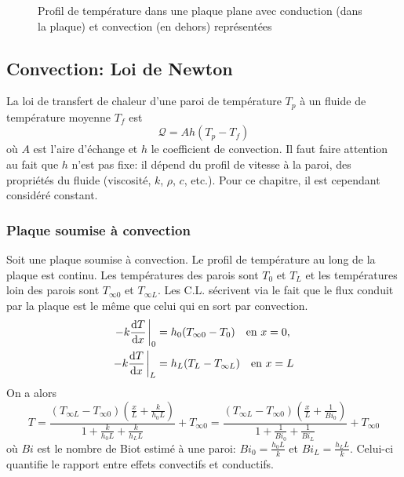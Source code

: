 \documentclass[a4paper,11pt]{report}
\newcommand{\recip}[1]{\frac{1}{#1}}
\begin{document}
        \begin{figure}[!h]
          \centering
          
          \caption{Profil de température dans une plaque plane avec conduction (dans la plaque) et convection (en dehors) représentées}
          \label{fig:profilTempPlane}
        \end{figure}

    \subsection{Convection: Loi de Newton}
      La loi de transfert de chaleur d'une paroi de température $T_p$ à un fluide de température moyenne $T_f$ est
      \begin{equation}
        \mathcal{Q} = Ah(T_p - T_f)
      \end{equation}
      où $A$ est l'aire d'échange et $h$ le coefficient de convection. Il faut faire attention au fait que $h$ n'est pas fixe: il dépend du profil de vitesse à la paroi, des propriétés du fluide (viscosité, $k$, $\rho$, $c$, etc.). Pour ce chapitre, il est cependant considéré constant.
      \subsubsection{Plaque soumise à convection}
        Soit une plaque soumise à convection. Le profil de température au long de la plaque est continu. Les températures des parois sont $T_0$ et $T_L$ et les températures loin des parois sont $T_{\infty 0}$ et $T_{\infty L}$. Les C.L. sécrivent via le fait que le flux conduit par la plaque est le même que celui qui en sort par convection.
        \begin{equation}
          \begin{aligned}
            -k \dv{T}{x} \eval_0 &= h_0 (T_{\infty 0} - T_0) \quad \textrm{en } x = 0,\\
            -k \dv{T}{x} \eval_L &= h_L (T_{L} - T_{\infty L}) \quad \textrm{en } x = L
          \end{aligned}
        \end{equation}
        On a alors
        \begin{equation}
          T = \frac{(T_{\infty L} - T_{\infty 0})\left(\frac{x}{L} + \frac{k}{h_0 L}\right)}{1 + \frac{k}{h_0 L} + \frac{k}{h_L L}} + T_{\infty 0}
          = \frac{(T_{\infty L} - T_{\infty 0})\left(\frac{x}{L} + \recip{Bi_0}\right)}{1 + \recip{Bi_0} + \recip{Bi_L}} + T_{\infty 0}
        \end{equation}
        où $Bi$ est le nombre de Biot estimé à une paroi: $Bi_0 = \frac{h_0 L}{k}$ et $Bi_L = \frac{h_L L}{k}$. Celui-ci quantifie le rapport entre effets convectifs et conductifs.
\end{document}
